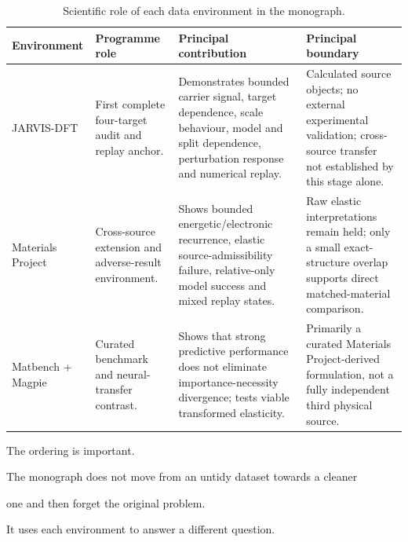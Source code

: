 \documentclass[11pt,a4paper,oneside]{report}
\begin{document}
\begin{table}[H]



\centering



\caption{Scientific role of each data environment in the monograph.}



\label{tab:dataset-roles}



\begin{tabularx}{\textwidth}{L{0.17\textwidth}
    L{0.23\textwidth}
    Y
    Y
}
\toprule
\textbf{Environment}
&
\textbf{Programme role}
&
\textbf{Principal contribution}
&
\textbf{Principal boundary}
\\
\midrule
JARVIS-DFT
&
First complete four-target audit and replay anchor.
&
Demonstrates bounded carrier signal,
target dependence,
scale behaviour,
model and split dependence,
perturbation response
and numerical replay.
&
Calculated source objects;
no external experimental validation;
cross-source transfer not established by this stage alone.
\\
\addlinespace
Materials Project
&
Cross-source extension and adverse-result environment.
&
Shows bounded energetic/electronic recurrence,
elastic source-admissibility failure,
relative-only model success
and mixed replay states.
&
Raw elastic interpretations remain held;
only a small exact-structure overlap supports direct matched-material
comparison.
\\
\addlinespace
Matbench + Magpie
&
Curated benchmark and neural-transfer contrast.
&
Shows that strong predictive performance does not eliminate
importance-necessity divergence;
tests viable transformed elasticity.
&
Primarily a curated Materials Project-derived formulation,
not a fully independent third physical source.
\\
\bottomrule
\end{tabularx}



\end{table}



The ordering is important.



The monograph does not move from an untidy dataset towards a cleaner

one and then forget the original problem.



It uses each environment to answer a different question.
\end{document}
